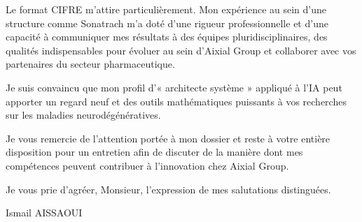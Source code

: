 \documentclass[11pt,a4paper]{article}
\begin{document}
Le format CIFRE m'attire particulièrement. Mon expérience au sein d'une structure comme Sonatrach m'a doté d'une rigueur professionnelle et d'une capacité à communiquer mes résultats à des équipes pluridisciplinaires, des qualités indispensables pour évoluer au sein d'Aixial Group et collaborer avec vos partenaires du secteur pharmaceutique.

Je suis convaincu que mon profil d'« architecte système » appliqué à l'IA peut apporter un regard neuf et des outils mathématiques puissants à vos recherches sur les maladies neurodégénératives.

Je vous remercie de l'attention portée à mon dossier et reste à votre entière disposition pour un entretien afin de discuter de la manière dont mes compétences peuvent contribuer à l'innovation chez Aixial Group.

Je vous prie d'agréer, Monsieur, l'expression de mes salutations distinguées.

\bigskip

\noindent Ismail AISSAOUI
\end{document}

